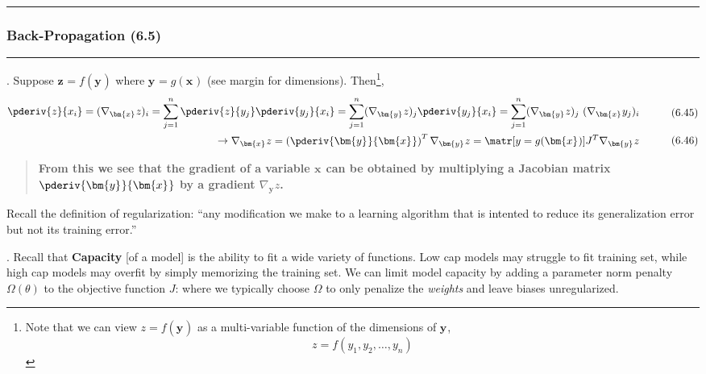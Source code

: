 \documentclass[11pt]{article}
\renewcommand\vec[2][]{\bm{#2}_{#1}}
\newcommand\myspace[1][]{\vspace{#1\bigskipamount}}
\newcommand\p{\Needspace{10\baselineskip} \noindent}
\newcommand\tlab[1]{\tag{#1}\label{#1}}
\newcommand\subsub[1]{\Needspace{15\baselineskip}\hrule\subsubsection{#1}\hrule}
\begin{document}
\myspace{}
\subsub{Back-Propagation (6.5)}

\myspace
\p {}. Suppose $\vec{z} = f(\vec{y})$ where $\vec{y} = g(\vec{x})$ (see margin for dimensions)\marginnote{
\[\vec{x} \in \R^{m} \] \[\vec{y} \in \R^{n} \] \[z: \R^{n}\rightarrow \R \] \[g: \R^{m}\rightarrow \R^n \]}. Then\footnote{Note that we can view $z = f(\vec{y})$ as a multi-variable function of the dimensions of $\vec{y}$, $$ z = f(y_1, y_2, \ldots, y_n)$$},
\begin{align}
\begin{split}
	\pderiv{z}{x_i} = (\nabla_{\vec{x}} z)_i 
		&= \sum_{j = 1}^{n} \pderiv{z}{y_j}\pderiv{y_j}{x_i} 
		= \sum_{j = 1}^{n}  (\nabla_{\vec{y}} z)_j \pderiv{y_j}{x_i}
		= \sum_{j = 1}^{n}  (\nabla_{\vec{y}} z)_j  ~  (\nabla_{\vec{x}} y_j)_i
\end{split}\tlab{6.45} \\
\rightarrow
\begin{split}
 \nabla_{\vec{x}} z &= \left( \pderiv{\vec{y}}{\vec{x}} \right)^T \nabla_{\vec{y}} z  
 	= \matr[y=g(\vec{x})]{J}^T \nabla_{\vec{y}} z  
\end{split}\tlab{6.46}
\end{align}
\begin{quote}
	\textbf{From this we see that the gradient of a variable $\vec{x}$ can be obtained by multiplying a Jacobian matrix $\pderiv{\vec{y}}{\vec{x}}$ by a gradient $ \nabla_{\vec{y}} z$.}
\end{quote}










Recall the definition of regularization: ``any modification we make to a learning algorithm that is intented to reduce its generalization error but not its training error.'' 


\myspace
\p {}. Recall that \textbf{Capacity} [of a model] is the ability to fit a wide variety of functions. Low cap models may struggle to fit training set, while high cap models may overfit by simply memorizing the training set. We can limit model capacity by adding a parameter norm penalty $\Omega(\theta)$ to the objective function $J$:
\graybox{
	\widetilde{J}(\theta; X, y) = J(\theta; X, y) + \alpha \Omega(\theta) \quad\text{where}\quad \alpha \in [0, \infty) \tlab{7.1}
	}
where we typically choose $\Omega$ to only penalize the \textit{weights} and leave biases unregularized.
\end{document}
